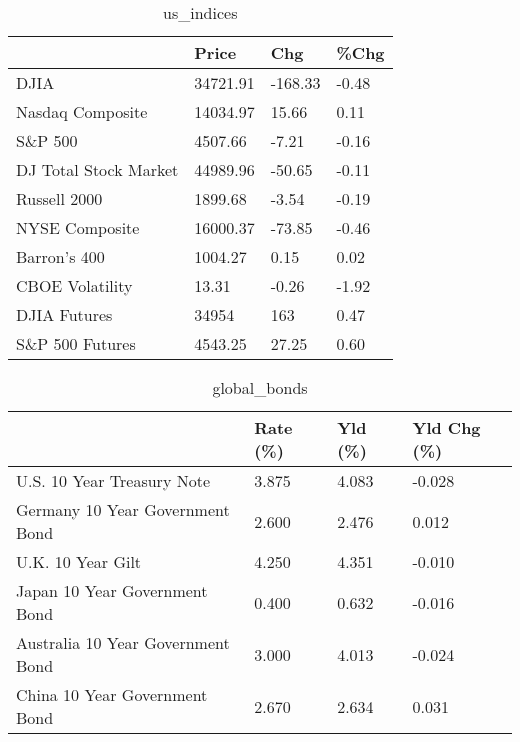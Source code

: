 \documentclass{article}%
\begin{document}
%


\begin{table}[htbp]%
\caption{us\_indices}%
\centering%
\begin{adjustbox}{width=1\textwidth}%
\begin{tabular}{llll}
\toprule
                      &    Price &     Chg &  \%Chg \\
\midrule
                 DJIA & 34721.91 & -168.33 & -0.48 \\
     Nasdaq Composite & 14034.97 &   15.66 &  0.11 \\
              S\&P 500 &  4507.66 &   -7.21 & -0.16 \\
DJ Total Stock Market & 44989.96 &  -50.65 & -0.11 \\
         Russell 2000 &  1899.68 &   -3.54 & -0.19 \\
       NYSE Composite & 16000.37 &  -73.85 & -0.46 \\
         Barron's 400 &  1004.27 &    0.15 &  0.02 \\
      CBOE Volatility &    13.31 &   -0.26 & -1.92 \\
         DJIA Futures &    34954 &     163 &  0.47 \\
      S\&P 500 Futures &  4543.25 &   27.25 &  0.60 \\
\bottomrule
\end{tabular}
%
\end{adjustbox}%
\end{table}

%


\begin{table}[htbp]%
\caption{global\_bonds}%
\centering%
\begin{adjustbox}{width=1\textwidth}%
\begin{tabular}{llll}
\toprule
                                  & Rate (\%) & Yld (\%) & Yld Chg (\%) \\
\midrule
       U.S. 10 Year Treasury Note &    3.875 &   4.083 &      -0.028 \\
  Germany 10 Year Government Bond &    2.600 &   2.476 &       0.012 \\
                U.K. 10 Year Gilt &    4.250 &   4.351 &      -0.010 \\
    Japan 10 Year Government Bond &    0.400 &   0.632 &      -0.016 \\
Australia 10 Year Government Bond &    3.000 &   4.013 &      -0.024 \\
    China 10 Year Government Bond &    2.670 &   2.634 &       0.031 \\
\bottomrule
\end{tabular}
%
\end{adjustbox}%
\end{table}
\end{document}
